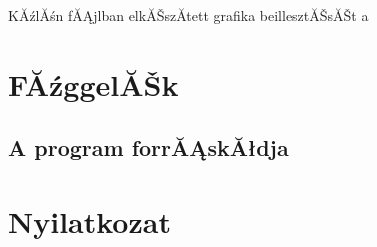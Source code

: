 \documentclass[12pt]{report}
\theoremstyle{definition}
\begin{document}
\newpage
%
KĂźlĂśn fĂĄjlban elkĂŠszĂ­tett grafika beillesztĂŠsĂŠt a 


\chapter{FĂźggelĂŠk}

\section{A program forrĂĄskĂłdja}


\chapter*{Nyilatkozat}

\end{document}
